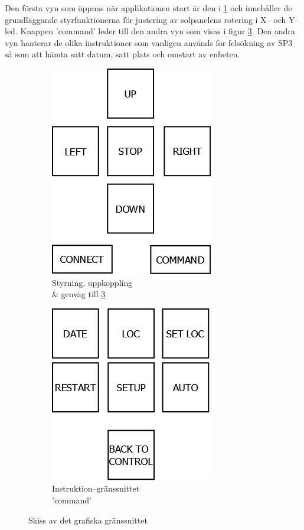 \documentclass{article}
\begin{document}
        \noindent Den första vyn som öppnas när applikationen start är den i \ref{fig:cross} och innehåller de grund\-läggande styrfunktionerna för justering av solpanelens rotering i X-- och Y--led. Knappen 'command' leder till den andra vyn som visas i figur \ref{fig:command}. Den andra vyn hanterar de olika instruktioner som vanligen används för felsökning av SP3 så som att hämta satt datum, satt plats och omstart av enheten.
      
        \begin{figure}[b!]
            \centering
            \begin{subfigure}[b]{0.4\textwidth}
                \centering
                \includegraphics[scale=0.3]{img/styrkors}
                \caption{Styrning, uppkoppling \\ \& genväg till \ref{fig:command}}
                \label{fig:cross}
            \end{subfigure}
            \begin{subfigure}[b]{0.4\textwidth}
                \centering
                \includegraphics[scale=0.3]{img/command}
                \caption{Instruktion--gränssnittet \\ 'command'}
                \label{fig:command}
            \end{subfigure}
            \caption{Skiss av det grafiska gränssnittet}
        \end{figure}
\end{document}
